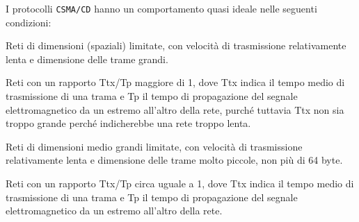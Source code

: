 \question[1]
I protocolli \texttt{CSMA/CD} hanno un comportamento quasi ideale nelle seguenti condizioni:

\begin{checkboxes}
	\CorrectChoice Reti di dimensioni (spaziali) limitate, con velocità di trasmissione relativamente lenta e dimensione delle trame grandi.

	\choice Reti con un rapporto Ttx/Tp maggiore di 1, dove Ttx indica il tempo medio di trasmissione di una trama e Tp il tempo di propagazione del segnale elettromagnetico da un estremo all'altro della rete, purché tuttavia Ttx non sia troppo grande perché indicherebbe una rete troppo lenta.

	\choice Reti di dimensioni medio grandi limitate, con velocità di trasmissione relativamente lenta e dimensione delle trame molto piccole, non più di 64 byte.

	\choice Reti con un rapporto Ttx/Tp circa uguale a 1, dove Ttx indica il tempo medio di trasmissione di una trama e Tp il tempo di propagazione del segnale elettromagnetico da un estremo all'altro della rete.
\end{checkboxes}
